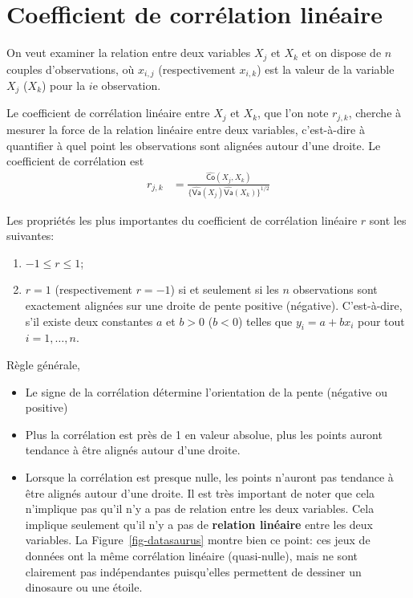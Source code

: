 \documentclass[
  11pt,
  letterpaper,
]{scrbook}
\providecommand{\tightlist}{%
  \setlength{\itemsep}{0pt}\setlength{\parskip}{0pt}}\usepackage{longtable,booktabs,array}
\theoremstyle{definition}
\theoremstyle{remark}
\begin{document}
\hypertarget{coefficient-de-corruxe9lation-linuxe9aire}{%
\section{Coefficient de corrélation
linéaire}\label{coefficient-de-corruxe9lation-linuxe9aire}}

On veut examiner la relation entre deux variables \(X_j\) et \(X_k\) et
on dispose de \(n\) couples d'observations, où \(x_{i, j}\)
(respectivement \(x_{i, k}\)) est la valeur de la variable \(X_j\)
(\(X_k\)) pour la \(i\)e observation.

Le coefficient de corrélation linéaire entre \(X_j\) et \(X_k\), que
l'on note \(r_{j, k}\), cherche à mesurer la force de la relation
linéaire entre deux variables, c'est-à-dire à quantifier à quel point
les observations sont alignées autour d'une droite. Le coefficient de
corrélation est \begin{align*}
r_{j, k} &= \frac{\widehat{\mathsf{Co}}(X_j, X_k)}{\{\widehat{\mathsf{Va}}(X_j) \widehat{\mathsf{Va}}(X_k)\}^{1/2}} 
\end{align*}

Les propriétés les plus importantes du coefficient de corrélation
linéaire \(r\) sont les suivantes:

\begin{enumerate}
\def\labelenumi{\arabic{enumi})}
\tightlist
\item
  \(-1 \leq r \leq 1\);
\item
  \(r=1\) (respectivement \(r=-1\)) si et seulement si les \(n\)
  observations sont exactement alignées sur une droite de pente positive
  (négative). C'est-à-dire, s'il existe deux constantes \(a\) et \(b>0\)
  (\(b<0\)) telles que \(y_i=a+b x_i\) pour tout \(i=1, \ldots, n\).
\end{enumerate}

Règle générale,

\begin{itemize}
\tightlist
\item
  Le signe de la corrélation détermine l'orientation de la pente
  (négative ou positive)
\item
  Plus la corrélation est près de 1 en valeur absolue, plus les points
  auront tendance à être alignés autour d'une droite.
\item
  Lorsque la corrélation est presque nulle, les points n'auront pas
  tendance à être alignés autour d'une droite. Il est très important de
  noter que cela n'implique pas qu'il n'y a pas de relation entre les
  deux variables. Cela implique seulement qu'il n'y a pas de
  \textbf{relation linéaire} entre les deux variables. La
  Figure~\ref{fig-datasaurus} montre bien ce point: ces jeux de données
  ont la même corrélation linéaire (quasi-nulle), mais ne sont
  clairement pas indépendantes puisqu'elles permettent de dessiner un
  dinosaure ou une étoile.
\end{itemize}
\end{document}
